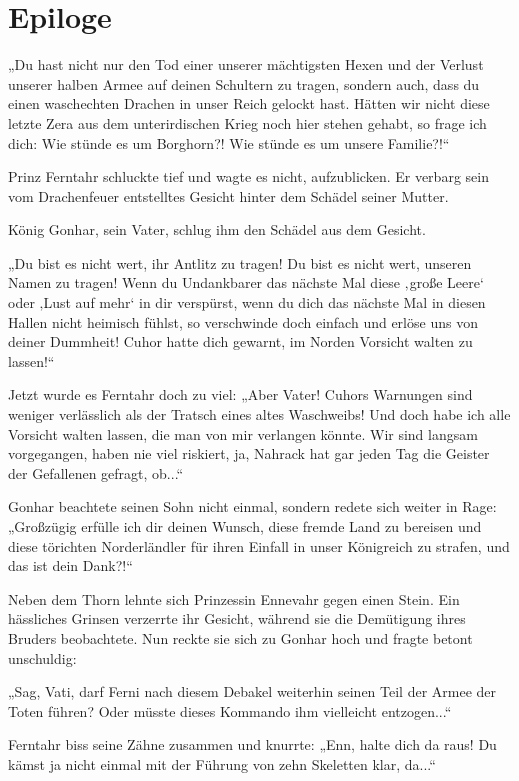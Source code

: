 \newpage
\section{Epiloge}


„Du hast nicht nur den Tod einer unserer mächtigsten Hexen und der Verlust unserer halben Armee auf deinen Schultern zu tragen, sondern auch, dass du einen waschechten Drachen in unser Reich gelockt hast. Hätten wir nicht diese letzte Zera aus dem unterirdischen Krieg noch hier stehen gehabt, so frage ich dich: Wie stünde es um Borghorn?! Wie stünde es um unsere Familie?!“

Prinz Ferntahr schluckte tief und wagte es nicht, aufzublicken. Er verbarg sein vom Drachenfeuer entstelltes Gesicht hinter dem Schädel seiner Mutter.

König Gonhar, sein Vater, schlug ihm den Schädel aus dem Gesicht.

„Du bist es nicht wert, ihr Antlitz zu tragen! Du bist es nicht wert, unseren Namen zu tragen! Wenn du Undankbarer das nächste Mal diese ‚große Leere‘ oder ‚Lust auf mehr‘ in dir verspürst, wenn du dich das nächste Mal in diesen Hallen nicht heimisch fühlst, so verschwinde doch einfach und erlöse uns von deiner Dummheit! Cuhor hatte dich gewarnt, im Norden Vorsicht walten zu lassen!“

Jetzt wurde es Ferntahr doch zu viel: „Aber Vater! Cuhors Warnungen sind weniger verlässlich als der Tratsch eines altes Waschweibs! Und doch habe ich alle Vorsicht walten lassen, die man von mir verlangen könnte. Wir sind langsam vorgegangen, haben nie viel riskiert, ja, Nahrack hat gar jeden Tag die Geister der Gefallenen gefragt, ob...“

Gonhar beachtete seinen Sohn nicht einmal, sondern redete sich weiter in Rage: „Großzügig erfülle ich dir deinen Wunsch, diese fremde Land zu bereisen und diese törichten Norderländler für ihren Einfall in unser Königreich zu strafen, und das ist dein Dank?!“

Neben dem Thorn lehnte sich Prinzessin Ennevahr gegen einen Stein. Ein hässliches Grinsen verzerrte ihr Gesicht, während sie die Demütigung ihres Bruders beobachtete. Nun reckte sie sich zu Gonhar hoch und fragte betont unschuldig:

„Sag, Vati, darf Ferni nach diesem Debakel weiterhin seinen Teil der Armee der Toten führen? Oder müsste dieses Kommando ihm vielleicht entzogen...“

Ferntahr biss seine Zähne zusammen und knurrte: „Enn, halte dich da raus! Du kämst ja nicht einmal mit der Führung von zehn Skeletten klar, da...“

